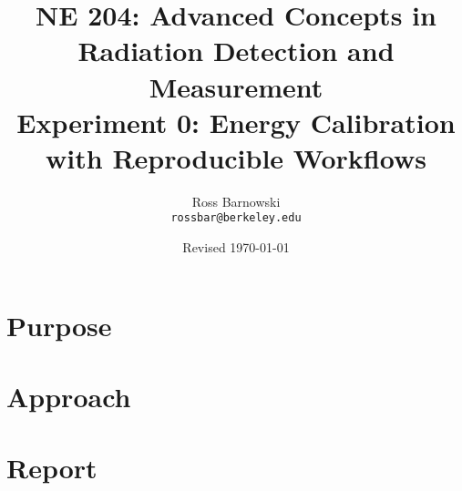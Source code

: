 \documentclass[11pt]{article}
\title{%
       NE 204: Advanced Concepts in Radiation Detection and \\ Measurement \\
       \Large\bf Experiment 0: Energy Calibration with Reproducible Workflows}
\author{Ross Barnowski \\ {\tt rossbar@berkeley.edu}}
\date{Revised \today}
\begin{document}
\maketitle

\section*{Purpose}

\section*{Approach}

\section*{Report}
\end{document}
